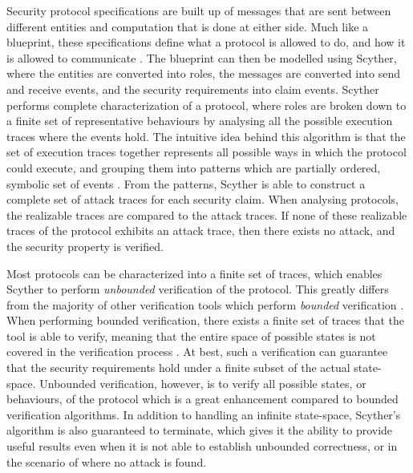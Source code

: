 Security protocol specifications are built up of messages that are sent between different entities and computation that is done at either side. Much like a blueprint, these specifications define what a protocol is allowed to do, and how it is allowed to communicate \cite{cremers2003defining}. The blueprint can then be modelled using Scyther, where the entities are converted into roles, the messages are converted into send and receive events, and the security requirements into claim events. Scyther performs complete characterization of a protocol, where roles are broken down to a finite set of representative behaviours by analysing all the possible execution traces where the events hold. The intuitive idea behind this algorithm is that the set of execution traces together represents all possible ways in which the protocol could execute, and grouping them into patterns which are partially ordered, symbolic set of events  \cite{cremers2006scyther}. From the patterns, Scyther is able to construct a complete set of attack traces for each security claim. When analysing protocols, the realizable traces are compared to the attack traces. If none of these realizable traces of the protocol exhibits an attack trace, then there exists no attack, and the security property is verified. 

Most protocols can be characterized into a finite set of traces, which enables Scyther to perform \emph{unbounded} verification of the protocol. This greatly differs from the majority of other verification tools which perform \emph{bounded} verification \cite{cremers2008scyther} \cite{cremers2009comparing}. When performing bounded verification, there exists a finite set of traces that the tool is able to verify, meaning that the entire space of possible states is not covered in the verification process \cite{cremers2008unbounded}. At best, such a verification can guarantee that the security requirements hold under a finite subset of the actual state-space. Unbounded verification, however, is to verify all possible states, or behaviours, of the protocol which is a great enhancement compared to bounded verification algorithms. In addition to handling an infinite state-space, Scyther's algorithm is also guaranteed to terminate, which gives it the ability to provide useful results even when it is not able to establish unbounded correctness, or in the scenario of where no attack is found.

